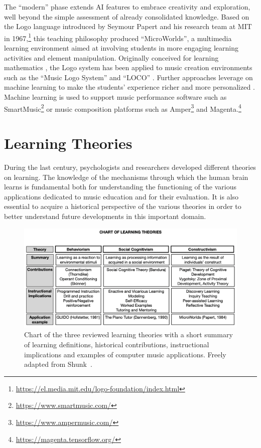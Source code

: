 \documentclass[10pt,journal,compsoc]{IEEEtran}
\begin{document}
The ``modern'' phase extends AI features to embrace creativity and exploration, well beyond the simple assessment of already consolidated knowledge. Based on the Logo language introduced by Seymour Papert and his research team at MIT in  1967,\footnote{\url{https://el.media.mit.edu/logo-foundation/index.html}} this teaching philosophy produced ``MicroWorlds'', a multimedia learning environment aimed at involving students in more engaging learning activities and element manipulation. Originally conceived for learning mathematics \cite{edwards1995design}, the Logo system has been applied to music creation environments such as the ``Music Logo System'' \cite{bamberger1979} and ``LOCO'' \cite{desain1988}. Further approaches leverage on machine learning to make the students' experience richer and more personalized \cite{delgado2013learning}. Machine learning is used to support music performance software such as SmartMusic\footnote{\url{https://www.smartmusic.com/}} or music composition platforms such as Amper\footnote{\url{https://www.ampermusic.com/}} and Magenta.\footnote{\url{https://magenta.tensorflow.org/}}



\section{Learning Theories}
\label{sec:theoryback}

During the last century, psychologists and researchers developed different theories on learning. The knowledge of the mechanisms through which the human brain learns is fundamental both for understanding the functioning of the various applications dedicated to music education and for their evaluation. It is also essential to acquire a historical perspective of the various theories in order to better understand future developments in this important domain. 

\begin{figure}[t]
	\centering
	\includegraphics[width=\columnwidth]{images/LT_CHART.png}
	\caption{Chart of the three reviewed learning theories with a short summary of learning definitions, historical contributions, instructional implications and examples of computer music applications. Freely adapted from Shunk~\cite{dale1991learning}.}
	\label{fig:LT}       
\end{figure}
\end{document}
